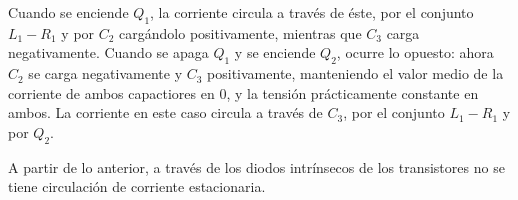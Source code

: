 \documentclass[e4_tp3_main.tex]{subfiles}
\begin{document}
Cuando se enciende $Q_1$, la corriente circula a través de éste, por el conjunto $L_1 - R_1$ y por $C_2$ cargándolo positivamente, mientras que $C_3$ carga negativamente. Cuando se apaga $Q_1$ y se enciende $Q_2$, ocurre lo opuesto: ahora $C_2$ se carga negativamente y $C_3$ positivamente, manteniendo el valor medio de la corriente de ambos capactiores en 0, y la tensión prácticamente constante en ambos. La corriente en este caso circula a través de $C_3$, por el conjunto $L_1 - R_1$ y por $Q_2$.\par
A partir de lo anterior, a través de los diodos intrínsecos de los transistores no se tiene circulación de corriente estacionaria.

\end{document}
